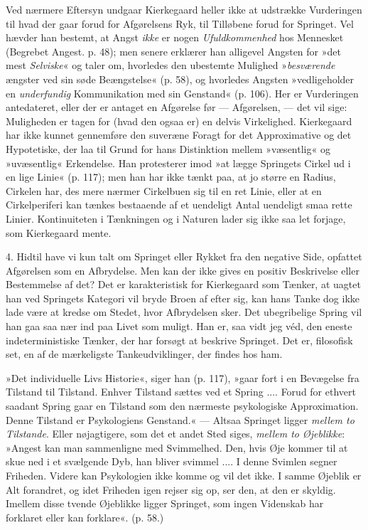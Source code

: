 \documentclass[12pt,a4paper,openany]{book}
\newcommand{\opage}[1]{\marginnote{\footnotesize\textit{[#1]}}}
\begin{document}
Ved nærmere Eftersyn undgaar Kierkegaard heller
ikke at udstrække Vurderingen til hvad der gaar forud
for Afgørelsens Ryk, til Tilløbene forud for Springet.
Vel hævder han bestemt, at Angst \textit{ikke} er nogen \textit{Ufuldkommenhed}
hos Mennesket (Begrebet Angest. p. 48);
men senere erklærer han alligevel Angsten for »det mest
\textit{Selviske}« og taler om, hvorledes den ubestemte Mulighed
»\textit{besværende} ængster ved sin søde Beængstelse« (p. 58),
og hvorledes Angsten »vedligeholder en \textit{underfundig}
Kommunikation med sin Genstand« (p. 106). Her er
Vurderingen antedateret, eller der er antaget en Afgørelse
før --- Afgørelsen, --- det vil sige: Muligheden er
tagen for (hvad den ogsaa er) en delvis Virkelighed.
\opage{78}Kierkegaard har ikke kunnet gennemføre den suveræne
Foragt for det Approximative og det Hypotetiske, der
laa til Grund for hans Distinktion mellem »væsentlig«
og »uvæsentlig« Erkendelse. Han protesterer imod »at
lægge Springets Cirkel ud i en lige Linie« (p. 117); men
han har ikke tænkt paa, at jo større en Radius, Cirkelen
har, des mere nærmer Cirkelbuen sig til en ret Linie,
eller at en Cirkelperiferi kan tænkes bestaaende af et
uendeligt Antal uendeligt smaa rette Linier. Kontinuiteten
i Tænkningen og i Naturen lader sig ikke saa let
forjage, som Kierkegaard mente.

4. Hidtil have vi kun talt om Springet eller Rykket
fra den negative Side, opfattet Afgørelsen som en
Afbrydelse. Men kan der ikke gives en positiv Beskrivelse
eller Bestemmelse af det? Det er karakteristisk
for Kierkegaard som Tænker, at uagtet han ved Springets
Kategori vil bryde Broen af efter sig, kan hans Tanke
dog ikke lade være at kredse om Stedet, hvor Afbrydelsen
sker. Det ubegribelige Spring vil han gaa saa nær
ind paa Livet som muligt. Han er, saa vidt jeg véd,
den eneste indeterministiske Tænker, der har forsøgt at
beskrive Springet. Det er, filosofisk set, en af de mærkeligste
Tankeudviklinger, der findes hos ham.

»Det individuelle Livs Historie«, siger han (p. 117),
»gaar fort i en Bevægelse fra Tilstand til Tilstand. Enhver
Tilstand sættes ved et Spring .... Forud for ethvert
saadant Spring gaar en Tilstand som den nærmeste
psykologiske Approximation. Denne Tilstand er Psykologiens
Genstand.« --- Altsaa Springet ligger \textit{mellem to
Tilstande}. Eller nøjagtigere, som det et andet Sted siges,
\textit{mellem to Øjeblikke}: »Angest kan man sammenligne med
Svimmelhed. Den, hvis Øje kommer til at skue ned i et
svælgende Dyb, han bliver svimmel .... I denne Svimlen
segner Friheden. Videre kan Psykologien ikke
\opage{79}komme og vil det ikke. I samme Øjeblik er Alt forandret,
og idet Friheden igen rejser sig op, ser den, at
den er skyldig. Imellem disse tvende Øjeblikke ligger
Springet, som ingen Videnskab har forklaret eller kan
forklare«. (p. 58.)
\end{document}
